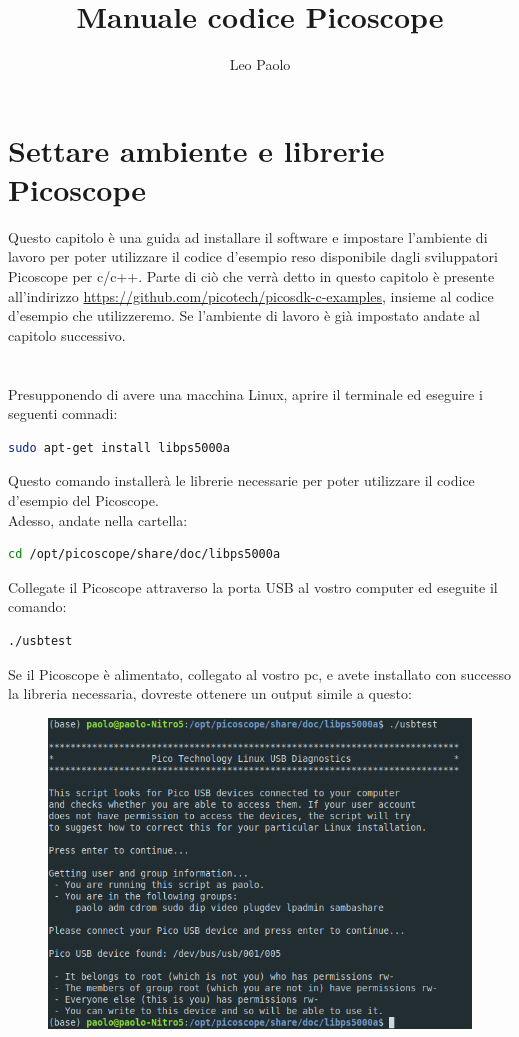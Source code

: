 \documentclass[a4paper]{article}
\begin{document}
\author{Leo Paolo}
\title{Manuale codice Picoscope}
\maketitle

\section{Settare ambiente e librerie Picoscope}
Questo capitolo è una guida ad installare il software e impostare l'ambiente di lavoro per poter utilizzare il codice d'esempio reso disponibile dagli sviluppatori Picoscope per c/c++. Parte di ciò che verrà detto in questo capitolo è presente all'indirizzo \url{https://github.com/picotech/picosdk-c-examples}, insieme al codice d'esempio che utilizzeremo. Se l'ambiente di lavoro è già impostato andate al capitolo successivo. \\
\\
\\
\noindent Presupponendo di avere una macchina Linux, aprire il terminale ed eseguire i seguenti comnadi:
\begin{lstlisting}[language=bash]
sudo apt-get install libps5000a
\end{lstlisting}
Questo comando installerà le librerie necessarie per poter utilizzare il codice d'esempio del Picoscope.\\
\noindent Adesso, andate nella cartella:
\begin{lstlisting}[language=bash]
cd /opt/picoscope/share/doc/libps5000a
\end{lstlisting}
Collegate il Picoscope attraverso la porta USB al vostro computer ed eseguite il comando:
\begin{lstlisting}[language=bash]
./usbtest
\end{lstlisting}
Se il Picoscope è alimentato, collegato al vostro pc, e avete installato con successo la libreria necessaria, dovreste ottenere un output simile a questo:
\begin{figure}[h!]
\centering
\includegraphics[scale=0.26]{Immagini/usbtest.png}
\end{figure}
\end{document}

